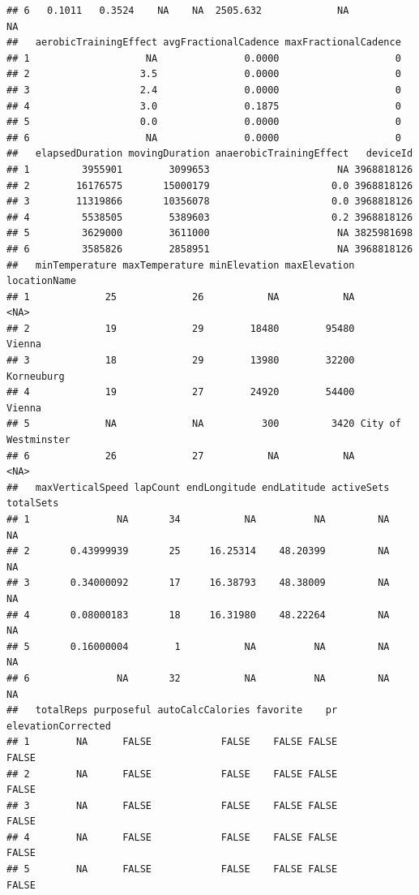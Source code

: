 \documentclass[
]{book}
\begin{document}
\begin{verbatim}
## 6   0.1011   0.3524    NA    NA  2505.632             NA            NA
##   aerobicTrainingEffect avgFractionalCadence maxFractionalCadence
## 1                    NA               0.0000                    0
## 2                   3.5               0.0000                    0
## 3                   2.4               0.0000                    0
## 4                   3.0               0.1875                    0
## 5                   0.0               0.0000                    0
## 6                    NA               0.0000                    0
##   elapsedDuration movingDuration anaerobicTrainingEffect   deviceId
## 1         3955901        3099653                      NA 3968818126
## 2        16176575       15000179                     0.0 3968818126
## 3        11319866       10356078                     0.0 3968818126
## 4         5538505        5389603                     0.2 3968818126
## 5         3629000        3611000                      NA 3825981698
## 6         3585826        2858951                      NA 3968818126
##   minTemperature maxTemperature minElevation maxElevation        locationName
## 1             25             26           NA           NA                <NA>
## 2             19             29        18480        95480              Vienna
## 3             18             29        13980        32200          Korneuburg
## 4             19             27        24920        54400              Vienna
## 5             NA             NA          300         3420 City of Westminster
## 6             26             27           NA           NA                <NA>
##   maxVerticalSpeed lapCount endLongitude endLatitude activeSets totalSets
## 1               NA       34           NA          NA         NA        NA
## 2       0.43999939       25     16.25314    48.20399         NA        NA
## 3       0.34000092       17     16.38793    48.38009         NA        NA
## 4       0.08000183       18     16.31980    48.22264         NA        NA
## 5       0.16000004        1           NA          NA         NA        NA
## 6               NA       32           NA          NA         NA        NA
##   totalReps purposeful autoCalcCalories favorite    pr elevationCorrected
## 1        NA      FALSE            FALSE    FALSE FALSE              FALSE
## 2        NA      FALSE            FALSE    FALSE FALSE              FALSE
## 3        NA      FALSE            FALSE    FALSE FALSE              FALSE
## 4        NA      FALSE            FALSE    FALSE FALSE              FALSE
## 5        NA      FALSE            FALSE    FALSE FALSE              FALSE

\end{verbatim}
\end{document}
